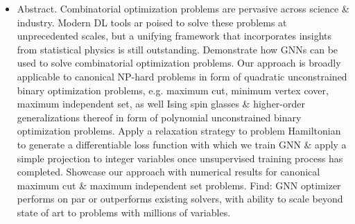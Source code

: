 \documentclass{article}
\begin{document}
\begin{itemize}
    \item {\sf Abstract.} Combinatorial optimization problems are pervasive across science \& industry. Modern DL tools ar poised to solve these problems at unprecedented scales, but a unifying framework that incorporates insights from statistical physics is still outstanding. Demonstrate how GNNs can be used to solve combinatorial optimization problems. Our approach is broadly applicable to canonical NP-hard problems in form of quadratic unconstrained binary optimization problems, e.g. maximum cut, minimum vertex cover, maximum independent set, as well Ising spin glasses \& higher-order generalizations thereof in form of polynomial unconstrained binary optimization problems. Apply a relaxation strategy to problem Hamiltonian to generate a differentiable loss function with which we train GNN \& apply a simple projection to integer variables once unsupervised training process has completed. Showcase our approach with numerical results for canonical maximum cut \& maximum independent set problems. Find: GNN optimizer performs on par or outperforms existing solvers, with ability to scale beyond state of art to problems with millions of variables.


\end{itemize}
\end{document}
